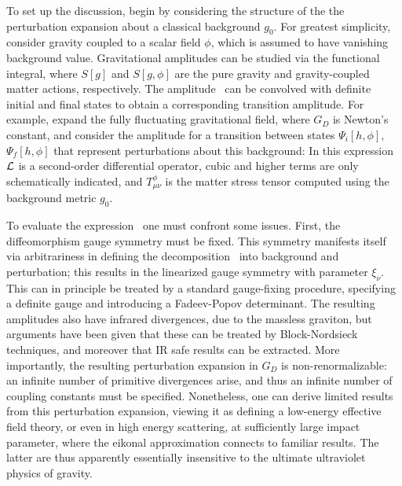 To set up the discussion, begin by considering the structure of the the perturbation expansion about a classical background $g_0$.  For greatest simplicity, consider gravity coupled to a scalar field $\phi$, which is assumed to have vanishing background value.  Gravitational amplitudes can be studied via the functional integral,
%
\eqn{}
%
where $S[g]$ and $S[g,\phi]$ are the pure gravity and gravity-coupled matter actions, respectively. The amplitude \gravfunc\ can be convolved with definite initial and final states to obtain a corresponding transition amplitude.  For example, expand the fully fluctuating gravitational field,
%
\eqn{}
%
where $G_D$ is Newton's constant, and consider the amplitude for a transition between states $\Psi_i[h,\phi]$, $\Psi_f[h,\phi]$ that represent perturbations about this background:
%
\eqn{}
%
In this expression ${\cal L}$ is a second-order differential operator, cubic and higher terms are only schematically indicated, and $T^\phi_{\mu\nu}$ is the matter stress tensor computed using the background metric $g_0$.  

To evaluate the expression \gravpert\ one must confront some issues.  First, the diffeomorphism gauge symmetry must be fixed.  This symmetry manifests itself via arbitrariness in defining the decomposition \gravexp\ into background and perturbation; this results in the linearized gauge symmetry
%
\eqn{}
%
with parameter $\xi_\nu$.  This can in principle be treated by a standard gauge-fixing procedure, specifying a definite gauge and introducing a Fadeev-Popov determinant.  The resulting amplitudes also have infrared divergences, due to the massless graviton, but arguments have been given that these can be treated by Block-Nordsieck techniques, and moreover that IR safe results can be extracted.  More importantly, the resulting perturbation expansion in $G_D$ is non-renormalizable: an infinite number of primitive divergences arise, and thus an infinite number of coupling constants must be specified.  Nonetheless, one can derive limited results from this perturbation expansion, viewing it as defining a low-energy effective field theory, or even in high energy scattering, at sufficiently large impact parameter, where the eikonal approximation connects to familiar results.  The latter are thus  apparently essentially insensitive to the ultimate ultraviolet physics of gravity.

